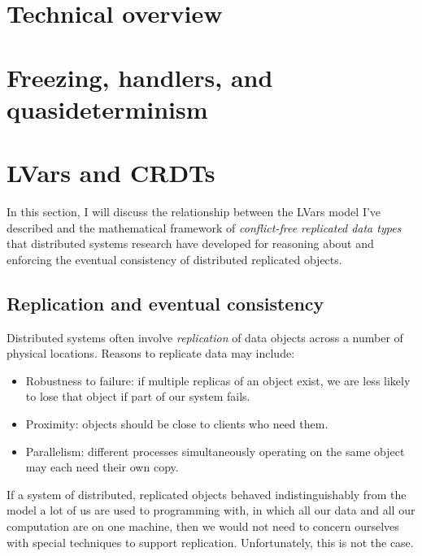 \documentclass{article}
\begin{document}

\section{Technical overview}

\section{Freezing, handlers, and quasideterminism}

\section{LVars and CRDTs}

In this section, I will discuss the relationship between the LVars
model I've described and the mathematical framework of
\emph{conflict-free replicated data types} that distributed systems
research have developed for reasoning about and enforcing the eventual
consistency of distributed replicated objects.

\subsection{Replication and eventual consistency}

Distributed systems often involve \emph{replication} of data objects
across a number of physical locations.  Reasons to replicate data may
include:
\begin{itemize}
\item Robustness to failure: if multiple replicas of an object exist,
  we are less likely to lose that object if part of our system fails.

\item Proximity: objects should be close to clients who need them.

\item Parallelism: different processes simultaneously operating on the
  same object may each need their own copy. 
\end{itemize}
If a system of distributed, replicated objects behaved
indistinguishably from the model a lot of us are used to programming
with, in which all our data and all our computation are on one
machine, then we would not need to concern ourselves with special
techniques to support replication.    Unfortunately, this is
not the case.
\end{document}
